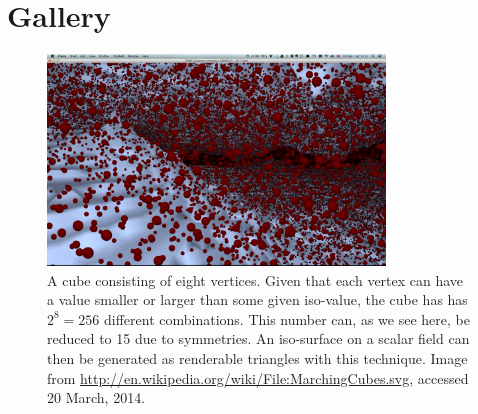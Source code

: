 \section{Gallery}
\label{sec:vis_gallery}

\begin{figure}[htb]
\begin{center}
\includegraphics[width=0.8\textwidth, trim=0cm 0cm 0cm 0cm, clip]{visualization/figures/marching_cubes_fracture.png}
\end{center}
\caption{A cube consisting of eight vertices. Given that each vertex can have a value smaller or larger than some given iso-value, the cube has has $2^8=256$ different combinations. This number can, as we see here, be reduced to 15 due to symmetries. An iso-surface on a scalar field can then be generated as renderable triangles with this technique. Image from \url{http://en.wikipedia.org/wiki/File:MarchingCubes.svg}, accessed 20 March, 2014.}
\label{fig:vis_marching_cubes}
\end{figure}

